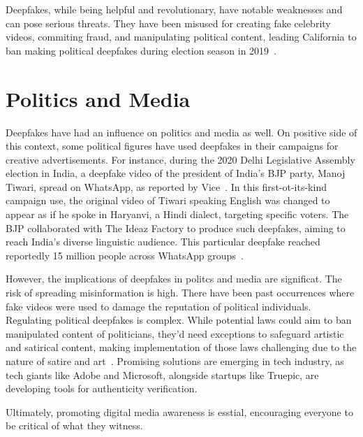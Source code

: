 Deepfakes, while being helpful and revolutionary, have notable weaknesses and can pose serious
threats. They have been misused for creating fake celebrity videos, commiting fraud, and manipulating
political content, leading California to ban making political deepfakes during election
season in 2019~\cite{salvador-dali,california}. 


\section{Politics and Media}
Deepfakes have had an influence on politics and media as well. On positive side of this context,
some political figures have used deepfakes in their campaigns for creative advertisements. 
For instance, during the 2020 Delhi Legislative Assembly election in India, a deepfake video 
of the president of India's \ac{BJP} party, Manoj Tiwari, spread on WhatsApp, as reported 
by Vice~\cite{vice}. In this first-ot-its-kind campaign use, the original video of Tiwari speaking 
English was changed to appear as if he spoke in Haryanvi, a Hindi dialect, targeting specific 
voters. The \ac{BJP} collaborated with The Ideaz Factory to produce such deepfakes, aiming to
reach India's diverse linguistic audience. This particular deepfake reached reportedly 15 million
people across WhatsApp groups~\cite{india}. 

However, the implications of deepfakes in politcs and
media are significat. The risk of spreading misinformation is high. There have been past 
occurrences where fake videos were used to damage the reputation of political individuals.
Regulating political deepfakes is complex. While potential laws could aim to ban manipulated
content of politicians, they'd need exceptions to safeguard artistic and satirical content, making
implementation of those laws challenging due to the nature of satire and art~\cite{politics,vanity-fair}. 
Promising solutions are emerging in tech industry, as tech giants like Adobe and Microsoft, alongside
startups like Truepic, are developing tools for authenticity verification.

Ultimately, promoting digital media awareness is esstial, encouraging everyone to be critical
of what they witness.